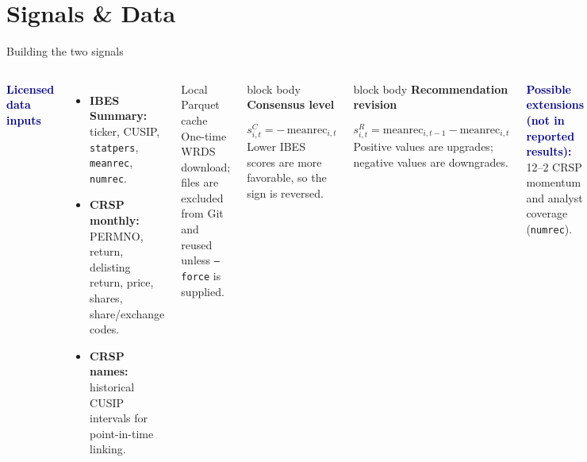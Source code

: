 \documentclass[aspectratio=169,10pt]{beamer}
\newcommand{\smallhead}[1]{\textcolor{navy}{\textbf{#1}}}
\newcommand{\signalbox}[3]{%
  \begin{beamercolorbox}[rounded=true,sep=.55em,wd=\linewidth]{block body}
    {\color{#1}\bfseries #2}\par\smallskip #3
  \end{beamercolorbox}}
\begin{document}
\section{Signals \& Data}
\begin{frame}[shrink=12]{Building the two signals}
\begin{columns}[T,onlytextwidth]
\smallhead{Licensed data inputs}
\begin{itemize}\setlength\itemsep{0.32em}
  \item \textbf{IBES Summary:} ticker, CUSIP, \texttt{statpers}, \texttt{meanrec}, \texttt{numrec}.
  \item \textbf{CRSP monthly:} PERMNO, return, delisting return, price, shares, share/exchange codes.
  \item \textbf{CRSP names:} historical CUSIP intervals for point-in-time linking.
\end{itemize}
\vspace{0.15cm}
\begin{block}{Local Parquet cache}
One-time WRDS download; files are excluded from Git and reused unless \texttt{--force} is supplied.
\end{block}
\signalbox{blue}{Consensus level}{%
\[s^{C}_{i,t}=-\,\mathrm{meanrec}_{i,t}\]
Lower IBES scores are more favorable, so the sign is reversed.}
\vspace{0.3cm}
\signalbox{cyan}{Recommendation revision}{%
\[s^{R}_{i,t}=\mathrm{meanrec}_{i,t-1}-\mathrm{meanrec}_{i,t}\]
Positive values are upgrades; negative values are downgrades.}
\vspace{0.25cm}
\smallhead{Possible extensions (not in reported results):} 12--2 CRSP momentum and analyst coverage (\texttt{numrec}).
\end{columns}
\end{frame}
\end{document}
